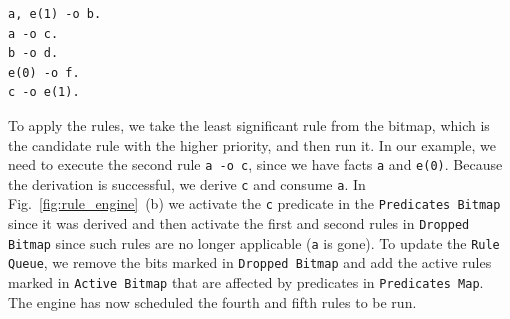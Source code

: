 \begin{Verbatim}
a, e(1) -o b.
a -o c.
b -o d.
e(0) -o f.
c -o e(1).
\end{Verbatim}

To apply the rules, we take the least significant rule from the bitmap, which is the candidate rule with the higher priority, and then run it. In our example, we need to execute the second rule \texttt{a -o c}, since we have facts \texttt{a} and \texttt{e(0)}.
Because the derivation is successful, we derive \texttt{c} and consume \texttt{a}. In Fig.~\ref{fig:rule_engine}~(b) we
activate the \texttt{c} predicate in the \texttt{Predicates Bitmap} since it was derived and then activate the first and second rules
in \texttt{Dropped Bitmap} since such rules are no longer applicable (\texttt{a} is gone). To update the \texttt{Rule Queue},
we remove the bits marked in \texttt{Dropped Bitmap} and add the active rules marked in \texttt{Active Bitmap} that are affected
by predicates in \texttt{Predicates Map}. The engine has now scheduled the fourth and fifth rules to be run.


